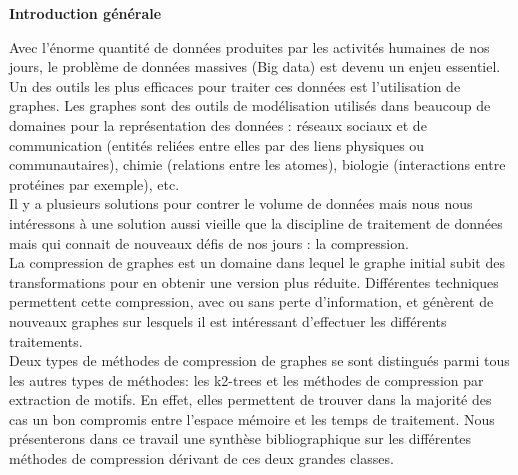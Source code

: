 \documentclass[a4paper,oneside,12pt]{report}
\theoremstyle{definition}
\begin{document}






\tableofcontents
\newpage

\listoffigures
{}
\cleardoublepage


\listoftables
{}
\cleardoublepage




		\Huge{ 
			\textbf {Introduction générale}} \\[0.5in]
			\normalsize
			Avec l'énorme quantité de données produites par les activités humaines de nos jours, le problème de données massives (Big data) est devenu un enjeu essentiel. Un des outils les plus efficaces pour traiter ces données est l'utilisation de graphes. Les graphes sont des outils de modélisation utilisés dans beaucoup de domaines pour la représentation des données : réseaux sociaux et de communication (entités reliées entre elles par des liens physiques ou communautaires), chimie (relations entre les atomes), biologie (interactions entre protéines par exemple), etc.\\
			
Il y a plusieurs solutions pour contrer le volume de données mais nous nous intéressons à une solution aussi vieille que la discipline de traitement de données mais qui connait de nouveaux défis de nos jours : la compression.\\

La compression de graphes est un domaine dans lequel le graphe initial subit des transformations pour en obtenir une version plus réduite. Différentes techniques permettent cette compression, avec ou sans perte d'information, et génèrent de nouveaux graphes sur lesquels il est intéressant d'effectuer les différents traitements.\\ 

Deux types de méthodes de compression de graphes se sont distingués parmi tous les autres types de méthodes: les k2-trees et les méthodes de compression par extraction de motifs. En effet, elles permettent de trouver dans la majorité des cas un bon compromis entre l'espace mémoire et les temps de traitement. Nous présenterons dans ce travail une synthèse bibliographique sur les différentes méthodes de compression dérivant de ces deux grandes classes.	\\
		
\end{document}
